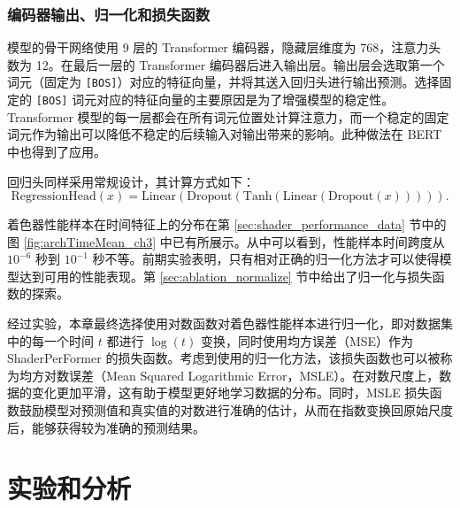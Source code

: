 \subsubsection{编码器输出、归一化和损失函数}

{} 模型的骨干网络使用 9 层的 Transformer 编码器，隐藏层维度为 768，注意力头数为 12。在最后一层的 Transformer 编码器后进入输出层。输出层会选取第一个词元（固定为 \verb|[BOS]|）对应的特征向量，并将其送入回归头进行输出预测。选择固定的 \verb|[BOS]| 词元对应的特征向量的主要原因是为了增强模型的稳定性。Transformer 模型的每一层都会在所有词元位置处计算注意力，而一个稳定的固定词元作为输出可以降低不稳定的后续输入对输出带来的影响。此种做法在 BERT \cite{devlin-etal-2019-bert}中也得到了应用。

{\amend 回归头同样采用常规设计，}其计算方式如下：
\begin{equation}
    \label{eq:reg_head}
    \text{RegressionHead}(x) = \text{Linear}(\text{Dropout}(\text{Tanh}(\text{Linear}(\text{Dropout}(x))))).
\end{equation}

{ 着色器性能样本在时间特征上的分布在第 \ref{sec:shader_performance_data} 节中的图 \ref{fig:archTimeMean_ch3} 中已有所展示。从中可以看到，}性能样本时间跨度从 $10^{-6}$ 秒到 $10^{-1}$ 秒不等。{\amend 前期实验表明，只有相对正确的归一化方法才可以使得模型达到可用的性能表现。第 \ref{sec:ablation_normalize} 节中给出了归一化与损失函数的探索。}

{\amend 经过实验，}本章最终选择使用对数函数对着色器性能样本进行归一化，即对数据集中的每一个时间 $t$ 都进行 $\log(t)$ 变换，同时使用均方误差（MSE）作为 ShaderPerFormer 的损失函数。考虑到使用的归一化方法，该损失函数也可以被称为均方对数误差（Mean Squared Logarithmic Error，MSLE）。在对数尺度上，数据的变化更加平滑，这有助于模型更好地学习数据的分布。同时，MSLE 损失函数鼓励模型对预测值和真实值的对数进行准确的估计，从而在指数变换回原始尺度后，能够获得较为准确的预测结果。

\section{实验和分析}


